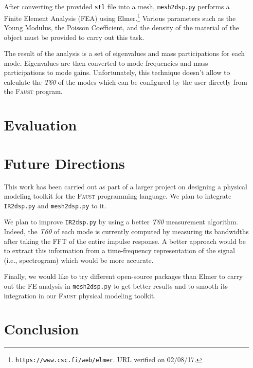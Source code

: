 \documentclass[11pt,a4paper]{article}
\newcommand{\f}{\textsc{Faust}}
\begin{document}
After converting the provided \texttt{stl} file into a mesh, \texttt{mesh2dsp.py} performs a Finite Element Analysis (FEA) using Elmer.\footnote{\texttt{https://www.csc.fi/web/elmer}. URL verified on 02/08/17.} Various parameters such as the Young Modulus, the Poisson Coefficient, and the density of the material of the object must be provided to carry out this task.

The result of the analysis is a set of eigenvalues and mass participations for each mode. Eigenvalues are then converted to mode frequencies and mass participations to mode gains. Unfortunately, this technique doesn't allow to calculate the \textit{T60} of the modes which can be configured by the user directly from the \f{} program. 

\section{Evaluation}


\section{Future Directions}
\label{sec:future}

This work has been carried out as part of a larger project on designing a physical modeling toolkit for the \f{} programming language. We plan to integrate \texttt{IR2dsp.py} and \texttt{mesh2dsp.py} to it.

We plan to improve \texttt{IR2dsp.py} by using a better \textit{T60} measurement algorithm. Indeed, the \textit{T60} of each mode is currently computed by measuring its bandwidths after taking the FFT of the entire impulse response. A better approach would be to extract this information from a time-frequency representation of the signal (i.e., spectrogram) which would be more accurate.

Finally, we would like to try different open-source packages than Elmer to carry out the FE analysis in \texttt{mesh2dsp.py} to get better results and to smooth its integration in our \f{} physical modeling toolkit.  

\section{Conclusion}
\end{document}
